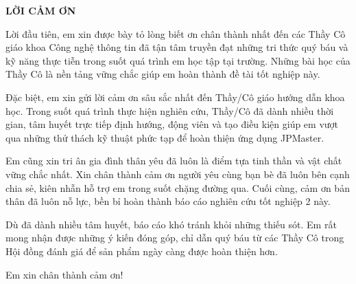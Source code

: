 \documentclass[../DoAn.tex]{subfiles}
\begin{document}
\begin{center}
    \Large{\textbf{LỜI CẢM ƠN}}\\
\end{center}
\vspace{1cm}

Lời đầu tiên, em xin được bày tỏ lòng biết ơn chân thành nhất đến các Thầy Cô giáo khoa Công nghệ thông tin đã tận tâm truyền đạt những tri thức quý báu và kỹ năng thực tiễn trong suốt quá trình em học tập tại trường. Những bài học của Thầy Cô là nền tảng vững chắc giúp em hoàn thành đề tài tốt nghiệp này.

Đặc biệt, em xin gửi lời cảm ơn sâu sắc nhất đến Thầy/Cô giáo hướng dẫn khoa học. Trong suốt quá trình thực hiện nghiên cứu, Thầy/Cô đã dành nhiều thời gian, tâm huyết trực tiếp định hướng, động viên và tạo điều kiện giúp em vượt qua những thử thách kỹ thuật phức tạp để hoàn thiện ứng dụng JPMaster.

Em cũng xin tri ân gia đình thân yêu đã luôn là điểm tựa tinh thần và vật chất vững chắc nhất. Xin chân thành cảm ơn người yêu cùng bạn bè đã luôn bên cạnh chia sẻ, kiên nhẫn hỗ trợ em trong suốt chặng đường qua. Cuối cùng, cảm ơn bản thân đã luôn nỗ lực, bền bỉ hoàn thành báo cáo nghiên cứu tốt nghiệp 2 này.

Dù đã dành nhiều tâm huyết, báo cáo khó tránh khỏi những thiếu sót. Em rất mong nhận được những ý kiến đóng góp, chỉ dẫn quý báu từ các Thầy Cô trong Hội đồng đánh giá để sản phẩm ngày càng được hoàn thiện hơn.

Em xin chân thành cảm ơn!
\end{document}
